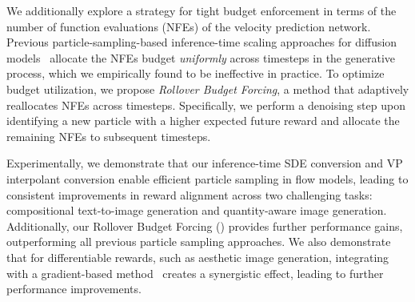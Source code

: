 We additionally explore a strategy for tight budget enforcement in terms of the number of function evaluations (NFEs) of the velocity prediction network. Previous particle-sampling-based inference-time scaling approaches for diffusion models~\cite{Li2024:SVDD, Singh:2025CoDE} allocate the NFEs budget \emph{uniformly} across timesteps in the generative process, which we empirically found to be ineffective in practice. To optimize budget utilization, we propose \emph{Rollover Budget Forcing}, a method that adaptively reallocates NFEs across timesteps. 
Specifically, we perform a denoising step upon identifying a new particle with a higher expected future reward and allocate the remaining NFEs to subsequent timesteps. 


Experimentally, we demonstrate that our inference-time SDE conversion and VP interpolant conversion enable efficient particle sampling in flow models, leading to consistent improvements in reward alignment across two challenging tasks: compositional text-to-image generation and quantity-aware image generation. 
Additionally, our Rollover Budget Forcing (\Ours{}) provides further performance gains, outperforming all previous particle sampling approaches. 
We also demonstrate that for differentiable rewards, such as aesthetic image generation, integrating \Ours{} with a gradient-based method~\cite{Chung:2023DPS} creates a synergistic effect, leading to further performance improvements. 



